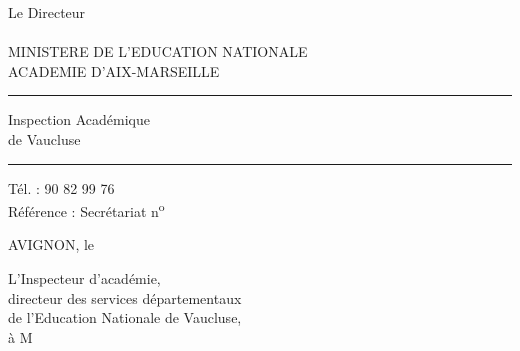 Le Directeur\\

\\
MINISTERE DE L'EDUCATION NATIONALE\\
ACADEMIE D'AIX-MARSEILLE\\
\rule{1cm}{0.3pt}

Inspection Académique\\
de Vaucluse\\
\rule{1cm}{0.3pt}

Tél. : 90 82 99 76\\
Référence : Secrétariat n\textsuperscript{o}

AVIGNON, le

L'Inspecteur d'académie,\\
directeur des services départementaux\\
de l'Education Nationale de Vaucluse,\\
à M





